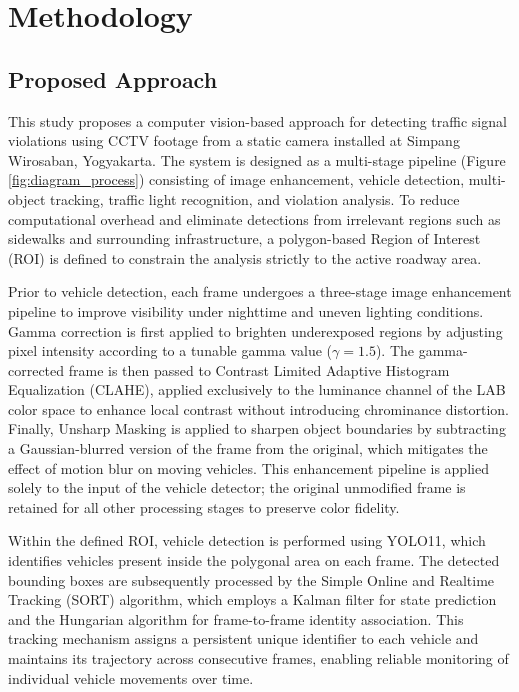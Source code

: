 \section{Methodology}

\subsection{Proposed Approach}
This study proposes a computer vision-based approach for detecting traffic signal violations using CCTV footage from a static camera installed at Simpang Wirosaban, Yogyakarta. The system is designed as a multi-stage pipeline (Figure \ref{fig:diagram_process}) consisting of image enhancement, vehicle detection, multi-object tracking, traffic light recognition, and violation analysis. To reduce computational overhead and eliminate detections from irrelevant regions such as sidewalks and surrounding infrastructure, a polygon-based Region of Interest (ROI) is defined to constrain the analysis strictly to the active roadway area.

\figDiagramProcess

Prior to vehicle detection, each frame undergoes a three-stage image enhancement pipeline to improve visibility under nighttime and uneven lighting conditions. Gamma correction is first applied to brighten underexposed regions by adjusting pixel intensity according to a tunable gamma value ($\gamma = 1.5$). The gamma-corrected frame is then passed to Contrast Limited Adaptive Histogram Equalization (CLAHE), applied exclusively to the luminance channel of the LAB color space to enhance local contrast without introducing chrominance distortion. Finally, Unsharp Masking is applied to sharpen object boundaries by subtracting a Gaussian-blurred version of the frame from the original, which mitigates the effect of motion blur on moving vehicles. This enhancement pipeline is applied solely to the input of the vehicle detector; the original unmodified frame is retained for all other processing stages to preserve color fidelity.

Within the defined ROI, vehicle detection is performed using YOLO11, which identifies vehicles present inside the polygonal area on each frame. The detected bounding boxes are subsequently processed by the Simple Online and Realtime Tracking (SORT) algorithm, which employs a Kalman filter for state prediction and the Hungarian algorithm for frame-to-frame identity association. This tracking mechanism assigns a persistent unique identifier to each vehicle and maintains its trajectory across consecutive frames, enabling reliable monitoring of individual vehicle movements over time.

